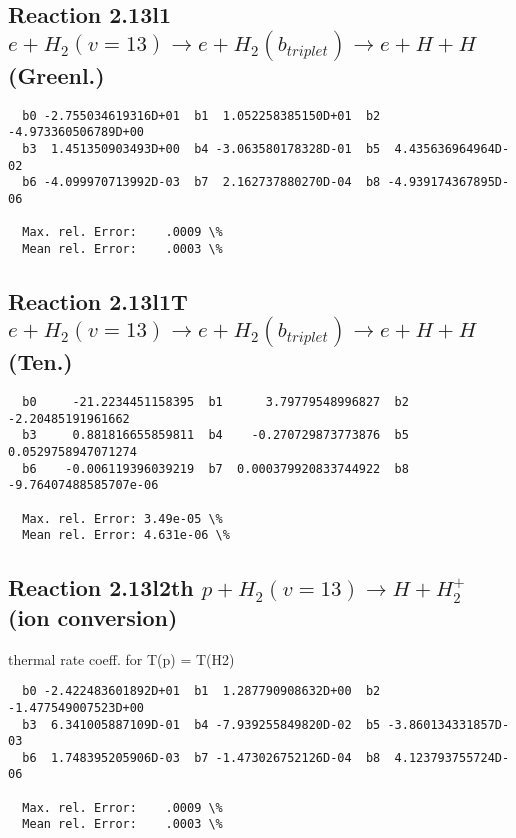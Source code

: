 \documentclass[12pt,dvipdfmx]{article}
\begin{document}
\subsection{
Reaction 2.13l1
$ e + H_2(v=13) \rightarrow e + H_2(b_{triplet})\rightarrow e + H + H $ (Greenl.)
}


\begin{small}\begin{verbatim}
  b0 -2.755034619316D+01  b1  1.052258385150D+01  b2 -4.973360506789D+00
  b3  1.451350903493D+00  b4 -3.063580178328D-01  b5  4.435636964964D-02
  b6 -4.099970713992D-03  b7  2.162737880270D-04  b8 -4.939174367895D-06

  Max. rel. Error:    .0009 \%
  Mean rel. Error:    .0003 \%
\end{verbatim}\end{small}


\subsection{
Reaction 2.13l1T
$ e +  H_2(v=13) \rightarrow e + H_2(b_{triplet})\rightarrow e + H + H $ (Ten.)
}


\begin{small}\begin{verbatim}
  b0     -21.2234451158395  b1      3.79779548996827  b2     -2.20485191961662
  b3     0.881816655859811  b4    -0.270729873773876  b5    0.0529758947071274
  b6    -0.006119396039219  b7  0.000379920833744922  b8 -9.76407488585707e-06

  Max. rel. Error: 3.49e-05 \%
  Mean rel. Error: 4.631e-06 \%
\end{verbatim}\end{small}


\subsection{
Reaction 2.13l2th
$ p + H_2(v=13) \rightarrow H + H_2^+$ (ion conversion)
}
thermal rate coeff. for T(p) = T(H2)

\begin{small}\begin{verbatim}
  b0 -2.422483601892D+01  b1  1.287790908632D+00  b2 -1.477549007523D+00
  b3  6.341005887109D-01  b4 -7.939255849820D-02  b5 -3.860134331857D-03
  b6  1.748395205906D-03  b7 -1.473026752126D-04  b8  4.123793755724D-06

  Max. rel. Error:    .0009 \%
  Mean rel. Error:    .0003 \%
\end{verbatim}\end{small}
\end{document}
